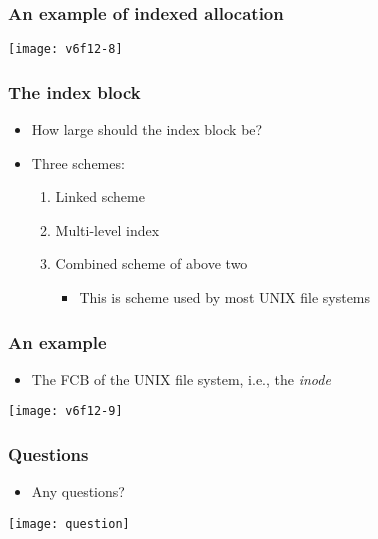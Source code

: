 \documentclass[CJKutf8,dvipsnames,table]{beamer}
\begin{document}
\begin{CJK*}{UTF8}{song}
  \begin{frame}
    \frametitle{An example of indexed allocation} \pause
    \begin{center}
      \texttt{[image: v6f12-8]}
    \end{center}
  \end{frame}
  
  \begin{frame}
    \frametitle{The index block} \pause
    \begin{itemize}
    \item How large should the index block be? \pause
    \item Three schemes: \pause
      \begin{enumerate}\parskip=0pt
      \item Linked scheme \pause
      \item Multi-level index \pause
      \item Combined scheme of above two \pause
        \begin{itemize}\parskip=0pt
        \item This is scheme used by most UNIX file systems
        \end{itemize}
      \end{enumerate}
    \end{itemize}
  \end{frame}
  
  \begin{frame}
    \frametitle{An example} \pause
    \begin{itemize}\parskip=0pt
    \item The FCB of the UNIX file system, i.e., the \emph{inode} \pause
    \end{itemize}
    \begin{center}
      \texttt{[image: v6f12-9]}
    \end{center}
  \end{frame}
  
  \begin{frame}
    \frametitle{Questions}
    \begin{itemize}
    \item Any questions?
    \end{itemize}
    \begin{center}
      \texttt{[image: question]}
    \end{center}
  \end{frame}
  

\end{CJK*}
\end{document}
